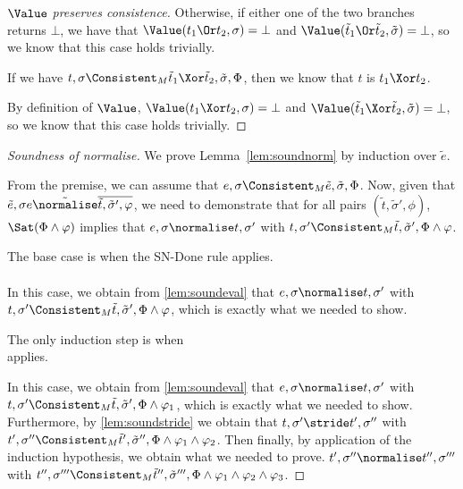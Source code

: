 \begin{proof}[$\Value$ preserves consistence]
{    Otherwise, if either one of the two branches returns $\bot$, we have that
    $\Value(t_1\Or t_2,\sigma)=\bot$ and $\Value(\tilde{t}_1\Or \tilde{t}_2,\tilde{\sigma})=\bot$,
    so we know that this case holds trivially.

    }

    {
    If we have $t,\sigma\Consistent_M\tilde{t}_1\Xor \tilde{t}_2,\tilde{\sigma},\Phi$, then we know that $t$ is $t_1\Xor t_2$.

    By definition of $\Value$, $\Value(t_1\Xor t_2,\sigma)=\bot$ and $\Value(\tilde{t}_1\Xor \tilde{t}_2,\tilde{\sigma})=\bot$, so we know that this case holds trivially.

    }
\end{proof}

\begin{proof}[Soundness of normalise]
  We prove Lemma~\ref{lem:soundnorm} by induction over $\tilde{e}$.

  From the premise, we can assume that $e,\sigma\Consistent_M\tilde{e},\tilde{\sigma},\Phi$.
  Now, given that $\tilde{e},\sigma{e}\tilde{\normalise} \overline{\tilde{t},\tilde{\sigma}',\phi}$,
  we need to demonstrate that for all pairs $(\tilde{t},\tilde{\sigma}',\phi)$,
  $\Sat(\Phi\land\phi)$ implies that $e,\sigma\normalise t,\sigma'$ with $t,\sigma'\Consistent_M\tilde{t},\tilde{\sigma}',\Phi\land\phi$.

The base case is when the SN-Done rule applies.\\
\\

In this case, we obtain from \cref{lem:soundeval} that
$e,\sigma\normalise t,\sigma'$ with $t,\sigma'\Consistent_M\tilde{t},\tilde{\sigma}',\Phi\land\phi$,
which is exactly what we needed to show.

The only induction step is when\\
 applies.

In this case, we obtain from \cref{lem:soundeval} that
$e,\sigma\normalise t,\sigma'$ with $t,\sigma'\Consistent_M\tilde{t},\tilde{\sigma}',\Phi\land\phi_1$,
which is exactly what we needed to show.
Furthermore, by \cref{lem:soundstride} we obtain that
$t,\sigma'\stride t',\sigma''$ with $t',\sigma''\Consistent_M\tilde{t}',\tilde{\sigma}'',\Phi\land\phi_1\land\phi_2$.
Then finally, by application of the induction hypothesis, we obtain what we needed to prove.
$t',\sigma''\normalise t'',\sigma'''$ with $t'',\sigma'''\Consistent_M\tilde{t}'',\tilde{\sigma}''',\Phi\land\phi_1\land\phi_2\land\phi_3$.

\end{proof}


